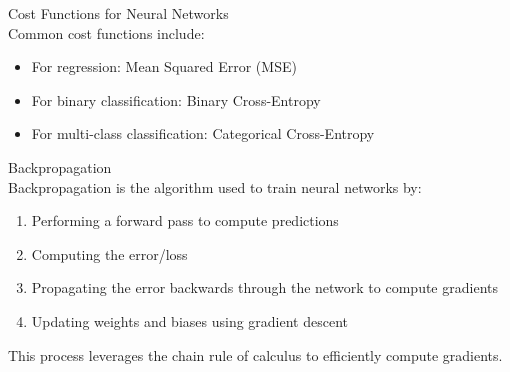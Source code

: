 
\begin{definition}{Cost Functions for Neural Networks}\\
Common cost functions include:
\begin{itemize}
    \item For regression: Mean Squared Error (MSE)
    \item For binary classification: Binary Cross-Entropy
    \item For multi-class classification: Categorical Cross-Entropy
\end{itemize}
\end{definition}

\begin{definition}{Backpropagation}\\
Backpropagation is the algorithm used to train neural networks by:
\begin{enumerate}
    \item Performing a forward pass to compute predictions
    \item Computing the error/loss
    \item Propagating the error backwards through the network to compute gradients
    \item Updating weights and biases using gradient descent
\end{enumerate}
This process leverages the chain rule of calculus to efficiently compute gradients.
\end{definition}


